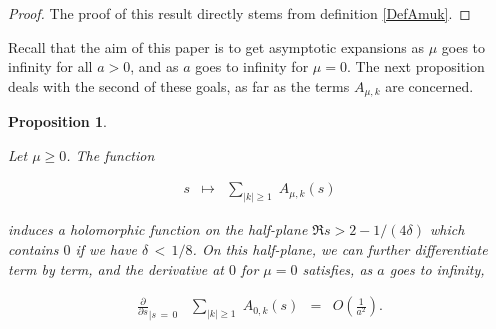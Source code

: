 \documentclass{jams-l}
\newtheorem{proposition}[theorem]{Proposition}
\theoremstyle{definition}
\theoremstyle{remark}
\numberwithin{equation}{section}
\begin{document}
            \begin{proof}
            
                The proof of this result directly stems from definition \ref{DefAmuk}.
            
            \end{proof}
            
            Recall that the aim of this paper is to get asymptotic expansions as $\mu$ goes to infinity for all $a > 0$, and as $a$ goes to infinity for $\mu = 0$. The next proposition deals with the second of these goals, as far as the terms $A_{\mu,k}$ are concerned.
            
            \begin{proposition}
            \label{PropAmukAsymptA}
            
                Let $\mu \geqslant 0$. The function
                
                \[ \begin{array}{ccc}
                        \displaystyle s & \longmapsto & \displaystyle \sum\limits_{\left \vert k \right \vert \geqslant 1} \; A_{\mu,k} \left( s \right)
                    \end{array} \]
            
                \noindent induces a holomorphic function on the half-plane $\Re s > 2 - 1/\left( 4 \delta \right)$ which contains $0$ if we have $\delta \, < \, 1/8$. On this half-plane, we can further differentiate term by term, and the derivative at $0$ for $\mu = 0$ satisfies, as $a$ goes to infinity,
            
                \[ \begin{array}{ccc}
                        \displaystyle \frac{\partial}{\partial s}_{\vert s \, = \, 0} \; \; \; \sum\limits_{\left \vert k \right \vert \geqslant 1} \; A_{0,k} \left( s \right) & = & \displaystyle O \left( \frac{1}{a^2} \right).
                    \end{array} \]
            
            \end{proposition}
            
\end{document}
